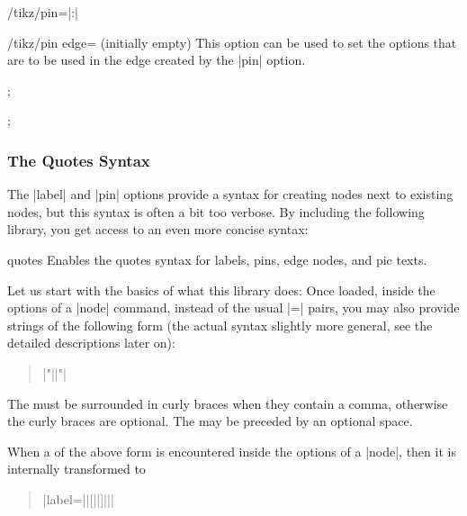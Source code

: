 \begin{key}{/tikz/pin=|:|}
    \begin{key}{/tikz/pin edge= (initially \normalfont empty)}
        This option can be used to set the options that are to be used in the
        edge created by the |pin| option.
\begin{codeexample}[]
\tikz[pin distance=10mm]
  ;
\end{codeexample}
\begin{codeexample}[]
\tikz [every pin edge/.style={},
       initial/.style={pin={[pin distance=5mm,
                             pin edge={<-,shorten <=1pt}]left:start}}]
  ;
\end{codeexample}
    \end{key}
\end{key}


\subsubsection{The Quotes Syntax}
\label{section-label-quotes}

The |label| and |pin| options provide a syntax for creating nodes next to
existing nodes, but this syntax is often a bit too verbose. By including the
following library, you get access to an even more concise syntax:

\begin{tikzlibrary}{quotes}
    Enables the quotes syntax for labels, pins, edge nodes, and pic texts.
\end{tikzlibrary}

Let us start with the basics of what this library does: Once loaded, inside the
options of a |node| command, instead of the usual |=|
pairs, you may also provide strings of the following form (the actual syntax
slightly more general, see the detailed descriptions later on):
%
\begin{quote}
    |"||"|
\end{quote}
%
The  must be surrounded in curly braces when they contain a
comma, otherwise the curly braces are optional. The  may be
preceded by an optional space.

When a  of the above form is encountered inside the options of a
|node|, then it is internally transformed to
%
\begin{quote}
    |label=||{[||]||}|
\end{quote}

